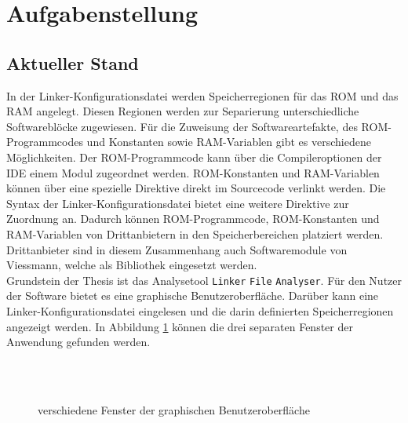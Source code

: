\section{Aufgabenstellung}\label{kap:aufgabenstellung}
\subsection{Aktueller Stand}\label{kap:atueller_stand}
In der Linker-Konfigurationsdatei werden Speicherregionen für das \ac{ROM} und das \ac{RAM} angelegt.
Diesen Regionen werden zur Separierung unterschiedliche Softwareblöcke zugewiesen.
Für die Zuweisung der Softwareartefakte, des \acs{ROM}-Programmcodes und Konstanten sowie \acs{RAM}-Variablen gibt es verschiedene Möglichkeiten.
Der \acs{ROM}-Programmcode kann über die Compileroptionen der \ac{IDE} einem Modul zugeordnet werden.
\acs{ROM}-Konstanten und \acs{RAM}-Variablen können über eine spezielle Direktive direkt im Sourcecode verlinkt werden.
Die Syntax der Linker-Konfigurationsdatei bietet eine weitere Direktive zur Zuordnung an.
Dadurch können \acs{ROM}-Programmcode, \acs{ROM}-Konstanten und \acs{RAM}-Variablen von Drittanbietern in den Speicherbereichen platziert werden.
Drittanbieter sind in diesem Zusammenhang auch Softwaremodule von Viessmann, welche als Bibliothek eingesetzt werden. \\

Grundstein der Thesis ist das Analysetool \verb*|Linker| \verb*|File| \verb*|Analyser|.
Für den Nutzer der Software bietet es eine graphische Benutzeroberfläche.
Darüber kann eine Linker-Konfigurationsdatei eingelesen und die darin definierten Speicherregionen angezeigt werden.
In Abbildung \ref{fig:anwendungsübersicht} können die drei separaten Fenster der Anwendung gefunden werden.\\

\begin{figure}[H]
	\centering
	 \\
	 \\
	\qquad	
	\caption{verschiedene Fenster der graphischen Benutzeroberfläche}
	\label{fig:anwendungsübersicht}
\end{figure}

